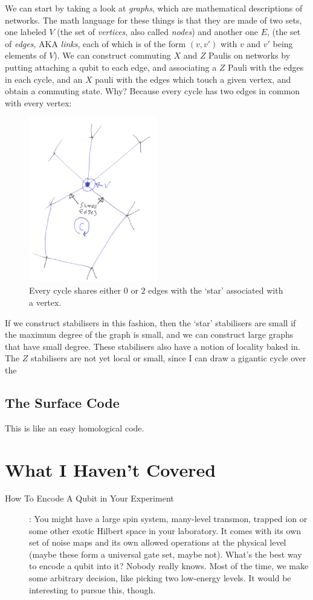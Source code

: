 \documentclass[10pt,a4paper, english]{scrartcl}
\begin{document}
We can start by taking a look at \emph{graphs}, which are mathematical descriptions of networks. 
The math language for these things is that they are made of two sets, one labeled $V$ (the set of \emph{vertices}, also called \emph{nodes}) and another one $E$, (the set of \emph{edges}, AKA \emph{links}, each of which is of the form $(v,v')$ with $v$ and $v'$ being elements of $V$). 
We can construct commuting $X$ and $Z$ Paulis on networks by putting attaching a qubit to each edge, and associating a $Z$ Pauli with the edges in each cycle, and an $X$ pauli with the edges which touch a given vertex, and obtain a commuting state. 
Why? Because every cycle has two edges in common with every vertex:
\begin{figure}[!h]
\centering
\includegraphics[width=0.5\textwidth]{graph_intersection.pdf}
\caption{Every cycle shares either $0$ or $2$ edges with the `star' associated with a vertex.}
\end{figure}
If we construct stabilisers in this fashion, then the `star' stabilisers are small if the maximum degree of the graph is small, and we can construct large graphs that have small degree.
These stabilisers also have a notion of locality baked in. 
The $Z$ stabilisers are not yet local or small, since I can draw a gigantic cycle over the 
\subsection{The Surface Code}
This is like an easy homological code.
\section{What I Haven't Covered}
\begin{description}
\item[How To Encode A Qubit in Your Experiment]: You might have a large spin system, many-level transmon, trapped ion or some other exotic Hilbert space in your laboratory.
It comes with its own set of noise maps and its own allowed operations at the physical level (maybe these form a universal gate set, maybe not).
What's the best way to encode a qubit into it?
Nobody really knows. 
Most of the time, we make some arbitrary decision, like picking two low-energy levels. 
It would be interesting to pursue this, though. 
\end{description}
\end{document}
